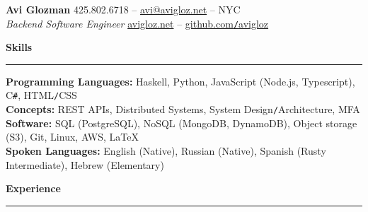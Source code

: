 \documentclass[10pt]{article}
\begin{document}
	\pagestyle{empty}
	\begin{center}
		{\huge \textbf{Avi Glozman}} {\large \hfill 425.802.6718 -- \href{mailto:avi@avigloz.net}{avi@avigloz.net} -- NYC} \\
		{\large \textsl{Backend Software Engineer} \hfill \href{https://avigloz.net}{avigloz.net} -- \href{https://github.com/avigloz}{github.com\texttt{/}avigloz}}
	\end{center}
	
	\begin{flushleft}	
		\vspace{-0.5mm}
		{\large \raggedright \textbf{Skills}}
		\vspace{1.25mm}
	
		\hrule
	
		\vspace{2.25mm}
		\textbf{Programming Languages:} Haskell, Python, JavaScript (Node.js, Typescript), C\verb!#!, HTML\texttt{/}CSS\\
		\vspace{0.5mm}
		\textbf{Concepts:} REST APIs, Distributed Systems, System Design\texttt{/}Architecture, MFA\\
		\vspace{0.5mm}
		\textbf{Software:} SQL (PostgreSQL), NoSQL (MongoDB, DynamoDB), Object storage (S3), Git, Linux, AWS, \LaTeX\\ 
		\vspace{0.5mm}
		\textbf{Spoken Languages:} English (Native), Russian (Native), Spanish (Rusty Intermediate), Hebrew (Elementary)

		\vspace{1.5mm}
		{\large \raggedright \textbf{Experience}}
		\vspace{1.25mm}
	
		\hrule

		\vspace{2.25mm}


\end{flushleft}
\end{document}

